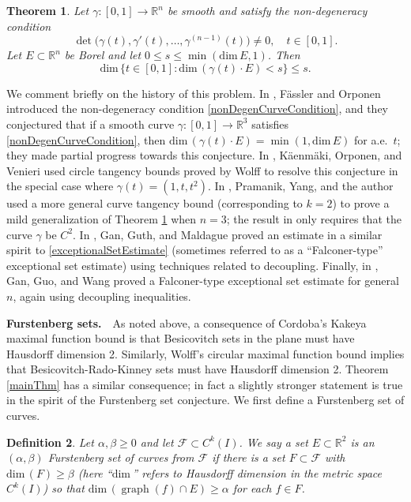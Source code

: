 \documentclass[letterpaper, reqno,11pt]{article}
\numberwithin{equation}{section}
\renewcommand{\dim}{\mathrm{dim}\,}
\newcommand{\RR}{\mathbb{R}}
\newtheorem{thm}{Theorem}
\numberwithin{thm}{section}
\newtheorem{defn}[thm]{Definition}
\theoremstyle{remark}
\begin{document}
\begin{thm}\label{KaufmanThm}
Let $\gamma\colon[0,1]\to\RR^n$ be smooth and satisfy the non-degeneracy condition 
    \begin{equation}\label{nonDegenCurveCondition}
        \det\big(\gamma(t),\gamma'(t),\ldots,\gamma^{(n-1)}(t)\big)\neq 0,\quad t\in [0,1].
    \end{equation}
Let $E\subset\RR^n$ be Borel and let $0\leq s\leq\min(\dim E, 1)$. Then 
    \begin{equation}\label{exceptionalSetEstimate}
        \dim\big\{ t\in [0,1]\colon \dim(\gamma(t)\cdot E)< s \big\}\leq s.
    \end{equation}
\end{thm}
We comment briefly on the history of this problem. In \cite{FasslerOrponen}, F\"assler and Orponen introduced the non-degeneracy condition \eqref{nonDegenCurveCondition}, and they conjectured that if a smooth curve $\gamma\colon [0,1]\to\RR^3$ satisfies \eqref{nonDegenCurveCondition}, then $\dim(\gamma(t)\cdot E)=\min(1, \dim E)$ for a.e.~$t$; they made partial progress towards this conjecture. In \cite{KOV2021}, K\"{a}enm\"{a}ki, Orponen, and Venieri used circle tangency bounds proved by Wolff to resolve this conjecture in the special case where $\gamma(t) = (1, t, t^2)$. In \cite{PYZ}, Pramanik, Yang, and the author used a more general curve tangency bound (corresponding to $k=2$) to prove a mild generalization of Theorem \ref{KaufmanThm} when $n=3$; the result in \cite{PYZ} only requires that the curve $\gamma$ be $C^2$. In \cite{GGM}, Gan, Guth, and Maldague proved an estimate in a similar spirit to \eqref{exceptionalSetEstimate} (sometimes referred to as a ``Falconer-type'' exceptional set estimate) using techniques related to decoupling. Finally, in \cite{GGW}, Gan, Guo, and Wang proved a Falconer-type exceptional set estimate for general $n$, again using decoupling inequalities. 

\medskip

\noindent \textbf{Furstenberg sets.}\ \ 
As noted above, a consequence of Cordoba's Kakeya maximal function bound is that Besicovitch sets in the plane must have Hausdorff dimension 2. Similarly, Wolff's circular maximal function bound implies that Besicovitch-Rado-Kinney sets must have Hausdorff dimension 2. Theorem \ref{mainThm} has a similar consequence; in fact a slightly stronger statement is true in the spirit of the Furstenberg set conjecture. We first define a Furstenberg set of curves.
\begin{defn}\label{furstenbergSetCurves}
Let $\alpha,\beta\geq 0$ and let $\mathcal{F}\subset C^k(I)$. We say a set $E\subset\RR^2$ is an $(\alpha,\beta)$ \emph{Furstenberg set of curves from} $\mathcal{F}$ if there is a set $F\subset\mathcal{F}$ with $\dim(F)\geq\beta$ (here ``$\dim\!$'' refers to Hausdorff dimension in the metric space $C^k(I)$) so that $\dim(\operatorname{graph}(f) \cap E)\geq \alpha$ for each $f \in F$.
\end{defn}
\end{document}
